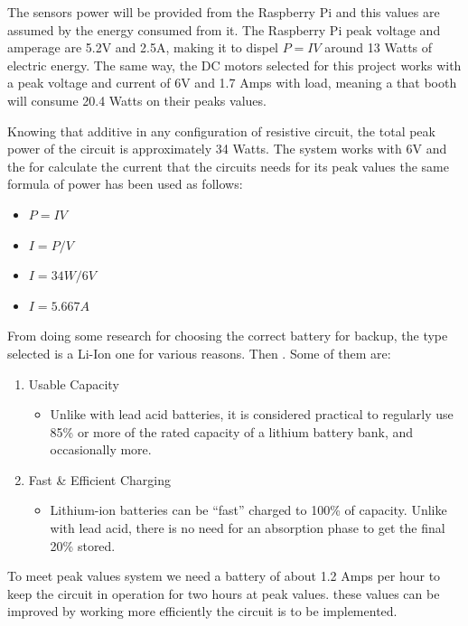 \documentclass[12pt]{article}
\begin{document}
The sensors power will be provided from the Raspberry Pi and this values are assumed by the energy consumed from it. The Raspberry Pi peak voltage and amperage are 5.2V and 2.5A, making it to dispel \(P = IV\) around 13 Watts of electric energy. The same way, the DC motors selected for this project works with a peak voltage and current of 6V and 1.7 Amps with load, meaning a that booth will consume 20.4 Watts on their peaks values.

Knowing that additive in any configuration of resistive circuit, the total peak power of the circuit is approximately 34 Watts. The system works with 6V and the for calculate the current that the circuits needs for its peak values the same formula of power\cite{AllAboutCircuits} has been used as follows:

\begin{itemize}
  \item \(P = IV\)
  \item \(I = P/V\)
  \item \(I = 34W/6V\)
  \item \(I = 5.667A\)
\end{itemize}

From doing some research for choosing the correct battery for backup, the type selected is a Li-Ion one for various reasons. Then . Some of them are:

\begin{enumerate}
  \item Usable Capacity

  \begin{itemize}
    \item Unlike with lead acid batteries, it is considered practical to regularly use 85\% or more of the rated capacity of a lithium battery bank, and occasionally more.
  \end{itemize}

  \item Fast \& Efficient Charging
  \begin{itemize}
    \item Lithium-ion batteries can be “fast” charged to 100\% of capacity. Unlike with lead acid, there is no need for an absorption phase to get the final 20\% stored.
  \end{itemize}
\end{enumerate}

To meet peak values system we need a battery of about 1.2 Amps per hour to keep the circuit in operation for two hours at peak values. these values can be improved by working more efficiently the circuit is to be implemented.
\end{document}
